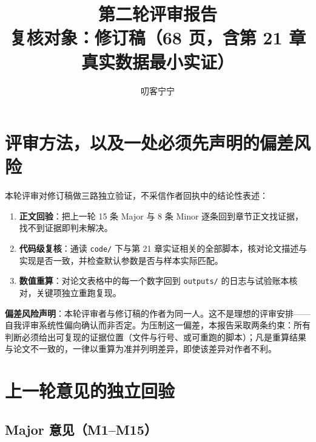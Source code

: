 \documentclass[11pt,a4paper]{ctexart}
\title{\bfseries 第二轮评审报告\\\large 复核对象：修订稿（68 页，含第 21 章真实数据最小实证）}
\author{\large 叨客宁宁}
\date{}
\begin{document}
\maketitle

\section{评审方法，以及一处必须先声明的偏差风险}

本轮评审对修订稿做三路独立验证，不采信作者回执中的结论性表述：

\begin{enumerate}
  \item \textbf{正文回验}：把上一轮 15 条 Major 与 8 条 Minor 逐条回到章节正文找证据，找不到证据即判未解决。
  \item \textbf{代码级复核}：通读 \texttt{code/} 下与第 21 章实证相关的全部脚本，核对论文描述与实现是否一致，并检查默认参数是否与样本实际匹配。
  \item \textbf{数值重算}：对论文表格中的每一个数字回到 \texttt{outputs/} 的日志与试验账本核对，关键项独立重跑复现。
\end{enumerate}

\textbf{偏差风险声明}：本轮评审者与修订稿的作者为同一人。这不是理想的评审安排——自我评审系统性偏向确认而非否定。为压制这一偏差，本报告采取两条约束：所有判断必须给出可复现的证据位置（文件与行号、或可重跑的脚本）；凡是重算结果与论文不一致的，一律以重算为准并列明差异，即使该差异对作者不利。

\section{上一轮意见的独立回验}

\subsection{Major 意见（M1--M15）}
\end{document}
